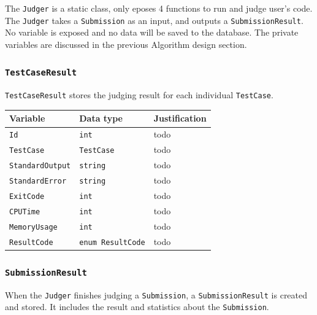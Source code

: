 \documentclass[a4paper]{report}
\begin{document}
The \texttt{Judger} is a static class, only eposes 4 functions to run and judge user's code. The \texttt{Judger} takes a \texttt{Submission} as an input, and outputs a \texttt{SubmissionResult}. No variable is exposed and no data will be saved to the database. The private variables are discussed in the previous Algorithm design section.

\subsubsection{\texttt{TestCaseResult}}

\texttt{TestCaseResult} stores the judging result for each individual \texttt{TestCase}.

\begin{tabulary}{\textwidth}{|l|l|L|}
    \hline
    Variable & Data type & Justification \\
    \hline
    \texttt{Id} & \texttt{int} & todo \\
    \hline
    \texttt{TestCase} & \texttt{TestCase} & todo \\
    \hline
    \texttt{StandardOutput} & \texttt{string} & todo \\
    \hline
    \texttt{StandardError} & \texttt{string} & todo \\
    \hline
    \texttt{ExitCode} & \texttt{int} & todo \\
    \hline
    \texttt{CPUTime} & \texttt{int} & todo \\
    \hline
    \texttt{MemoryUsage} & \texttt{int} & todo \\
    \texttt{ResultCode} & \texttt{enum ResultCode} & todo \\
    \hline
\end{tabulary}

\subsubsection{\texttt{SubmissionResult}}

When the \texttt{Judger} finishes judging a \texttt{Submission}, a \texttt{SubmissionResult} is created and stored. It includes the result and statistics about the \texttt{Submission}.
\end{document}
